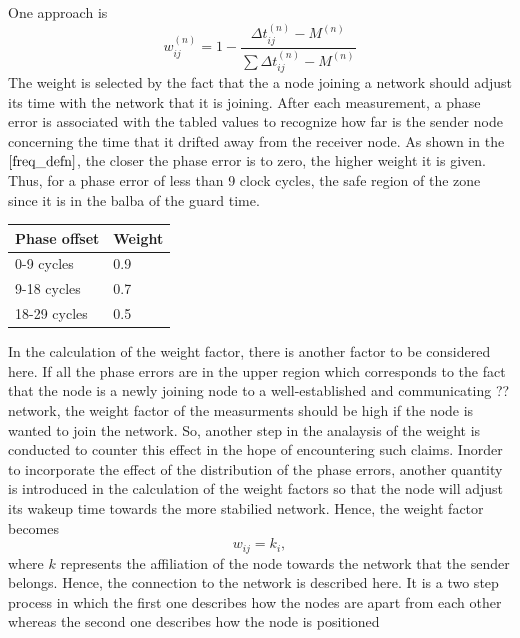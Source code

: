 \documentclass[a4paper,8pt]{report}
\begin{document}
\newline One approach is
\begin{equation}
w_{ij}^{(n)} = 1 - \frac {\Delta t_{ij}^{(n)}- M^{(n)}}{\sum \Delta
t_{ij}^{(n)}-M^{(n)}}
\end{equation}
The weight is selected by the fact that the a node joining a network
should adjust its time with the network that it is joining. After
each measurement, a phase error is associated with the tabled values
to recognize how far is the sender node concerning the time that it
drifted away from the receiver node. As shown in the
$\ref{freq_defn}$, the closer the phase error is to zero, the higher
weight it is given. Thus, for a phase error of less than 9 clock
cycles, the safe region of the zone since it is in the balba of the
guard time.
\begin{center}
    \begin{tabular}{ | l | l |}
    \hline
    Phase offset & Weight \\ \hline
    0-9 cycles & 0.9 \\ \hline
    9-18 cycles & 0.7 \\ \hline
    18-29 cycles & 0.5 \\
    \hline
    \end{tabular}
\end{center}
In the calculation of the weight factor, there is another factor to
be considered here. If all the phase errors are in the upper region
which corresponds to the fact that the node is a newly joining node
to a well-established and communicating ?? network, the weight
factor of the measurments should be high if the node is wanted to
join the network. So, another step in the analaysis of the weight is
conducted to counter this effect in the hope of encountering such
claims. \newline Inorder to incorporate the effect of the
distribution of the phase errors, another quantity is introduced in
the calculation of the weight factors so that the node will adjust
its wakeup time towards the more stabilied network. Hence, the
weight factor becomes
\begin{equation}
 w_{ij} = k_i ,
\end{equation}
where $k$ represents the affiliation of the node towards the network
that the sender belongs. Hence, the connection to the network is described here.
\newline It is a two step process in which the first one describes how the nodes
are apart from each other whereas the second one describes how the node is positioned
\end{document}
